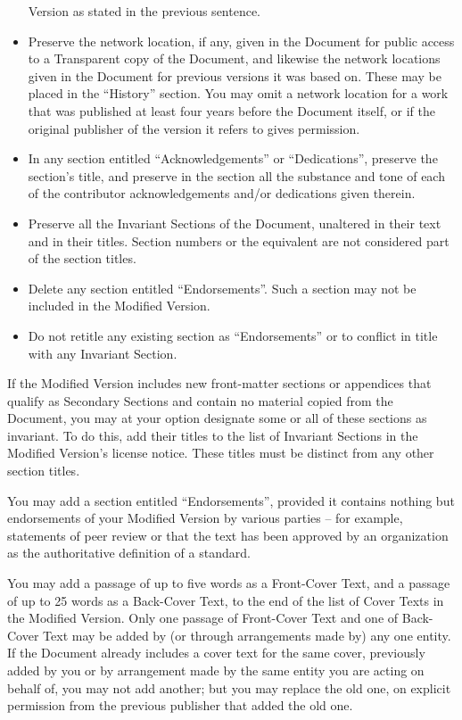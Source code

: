 \documentclass[a4paper,11pt,twoside,dvips]{report}
\begin{document}
\begin{itemize}
   Version as stated in the previous sentence.
\item Preserve the network location, if any, given in the Document for
   public access to a Transparent copy of the Document, and likewise
   the network locations given in the Document for previous versions
   it was based on.  These may be placed in the ``History'' section.
   You may omit a network location for a work that was published at
   least four years before the Document itself, or if the original
   publisher of the version it refers to gives permission.
\item In any section entitled ``Acknowledgements'' or ``Dedications'',
   preserve the section's title, and preserve in the section all the
   substance and tone of each of the contributor acknowledgements
   and/or dedications given therein.
\item Preserve all the Invariant Sections of the Document,
   unaltered in their text and in their titles.  Section numbers
   or the equivalent are not considered part of the section titles.
\item Delete any section entitled ``Endorsements''.  Such a section
   may not be included in the Modified Version.
\item Do not retitle any existing section as ``Endorsements''
   or to conflict in title with any Invariant Section.

\end{itemize}

If the Modified Version includes new front-matter sections or
appendices that qualify as Secondary Sections and contain no material
copied from the Document, you may at your option designate some or all
of these sections as invariant.  To do this, add their titles to the
list of Invariant Sections in the Modified Version's license notice.
These titles must be distinct from any other section titles.

You may add a section entitled ``Endorsements'', provided it contains
nothing but endorsements of your Modified Version by various
parties -- for example, statements of peer review or that the text has
been approved by an organization as the authoritative definition of a
standard.

You may add a passage of up to five words as a Front-Cover Text, and a
passage of up to 25 words as a Back-Cover Text, to the end of the list
of Cover Texts in the Modified Version.  Only one passage of
Front-Cover Text and one of Back-Cover Text may be added by (or
through arrangements made by) any one entity.  If the Document already
includes a cover text for the same cover, previously added by you or
by arrangement made by the same entity you are acting on behalf of,
you may not add another; but you may replace the old one, on explicit
permission from the previous publisher that added the old one.
\end{document}
